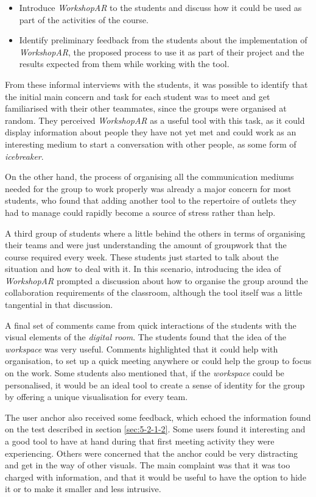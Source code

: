 \begin{itemize}
    \item Introduce \emph{WorkshopAR} to the students and discuss how it could be used as part of the activities of the course.
    \item Identify preliminary feedback from the students about the implementation of \emph{WorkshopAR}, the proposed process to use it as part of their project and the
    results expected from them while working with the tool.
\end{itemize}

From these informal interviews with the students, it was possible to identify that the initial main concern and task for each student was to meet and get familiarised with
their other teammates, since the groups were organised at random. They perceived \emph{WorkshopAR} as a useful tool with this task, as it could display information about
people they have not yet met and could work as an interesting medium to start a conversation with other people, as some form of \emph{icebreaker}.

On the other hand, the process of organising all the communication mediums needed for the group to work properly was already a major concern for most students, who found
that adding another tool to the repertoire of outlets they had to manage could rapidly become a source of stress rather than help.

A third group of students where a little behind the others in terms of organising their teams and were just understanding the amount of groupwork that the course required
every week. These students just started to talk about the situation and how to deal with it. In this scenario, introducing the idea of \emph{WorkshopAR} prompted a
discussion about how to organise the group around the collaboration requirements of the classroom, although the tool itself was a little tangential in that discussion.

A final set of comments came from quick interactions of the students with the visual elements of the \emph{digital room}. The students found that the idea of the \emph{workspace}
was very useful. Comments highlighted that it could help with organisation, to set up a quick meeting anywhere or could help the group to focus on the work. Some students
also mentioned that, if the \emph{workspace} could be personalised, it would be an ideal tool to create a sense of identity for the group by offering a unique visualisation
for every team.

The user anchor also received some feedback, which echoed the information found on the test described in section \ref{sec:5-2-1-2}. Some users found it interesting and a
good tool to have at hand during that first meeting activity they were experiencing. Others were concerned that the anchor could be very distracting and get in the way of
other visuals. The main complaint was that it was too charged with information, and that it would be useful to have the option to hide it or to make it smaller and less
intrusive.

